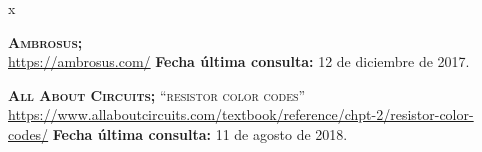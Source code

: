 
\begin{thebibliography} {x}
	
	\pagestyle{empty}
	\thispagestyle{empty}

	\begingroup %
	\raggedright 
	\sloppy
	
	 \textsc{\textbf{Ambrosus; }} \\
	\url{https://ambrosus.com/}
	\newline \textbf{Fecha última consulta:} 12 de diciembre de 2017.
	
	 \textsc{\textbf{All About Circuits; }}\textsc{“resistor color codes”} \\ 
	\url{https://www.allaboutcircuits.com/textbook/reference/chpt-2/resistor-color-codes/}
	\newline \textbf{Fecha última consulta:} 11 de agosto de 2018.
							
		
	

		


\end{thebibliography}
